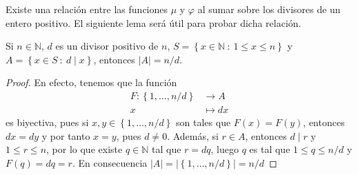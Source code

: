 Existe una relación entre las funciones $\mu$ y $\varphi$ al sumar sobre los divisores de un entero positivo. El siguiente lema será útil para probar dicha relación.

\begin{lemma}\label{lemma:car1}
Si $n\in\mathbb{N}$, $d$ es un divisor positivo de $n$, $S=\left\{x\in\mathbb{N} \: : \: 1\leq x\leq n\right\}$ y $A=\left\{x\in S \: : \: d \mid x\right\}$, entonces $|A|=n/d$.
\end{lemma}
\begin{proof}
En efecto, tenemos que la función
\begin{align*}
	F:\left\{1,\ldots,n/d\right\} & \longrightarrow A \\
	x & \longmapsto dx
\end{align*}
es biyectiva, pues si $x,y\in \left\{1,\ldots,n/d\right\}$ son tales que $F(x)=F(y)$, entonces $dx=dy$ y por tanto $x=y$, pues $d\neq 0$. Además, si $r\in A$, entonces $d \mid r$ y $1\leq r\leq n$, por lo que existe $q\in\mathbb{N}$ tal que $r=dq$, luego $q$ es tal que $1\leq q\leq n/d$ y $F(q)=dq=r$. En consecuencia $|A|=|\left\{1,\ldots,n/d\right\}|=n/d$
\end{proof}

